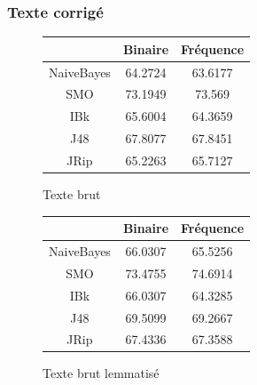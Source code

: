 \documentclass[a4paper, 11pt]{article}
\begin{document}
\subsubsection{Texte corrigé}
\begin{figure}[h]
\begin{minipage}{0.5\textwidth}
\begin{tabular}{|c|c|c|}
\hline
 & Binaire & Fréquence \\
 \hline
 NaiveBayes & 64.2724  & 63.6177 \\
 \hline
 SMO & 73.1949 & 73.569 \\
 \hline
 IBk & 65.6004 & 64.3659 \\
 \hline
 J48 & 67.8077 & 67.8451 \\
 \hline
 JRip & 65.2263 & 65.7127 \\
 \hline
\end{tabular}
\caption{Texte brut}
\end{minipage}
\begin{minipage}{0.5\textwidth}
\begin{tabular}{|c|c|c|}
\hline
 & Binaire & Fréquence \\
 \hline
 NaiveBayes & 66.0307 & 65.5256 \\
 \hline
 SMO & 73.4755 & 74.6914 \\
 \hline
 IBk & 66.0307 & 64.3285 \\
 \hline
 J48 & 69.5099 & 69.2667 \\
 \hline
 JRip & 67.4336 & 67.3588 \\
 \hline
\end{tabular}
\caption{Texte brut lemmatisé}
\end{minipage}
\end{figure}
\vspace{1cm}
\end{document}
